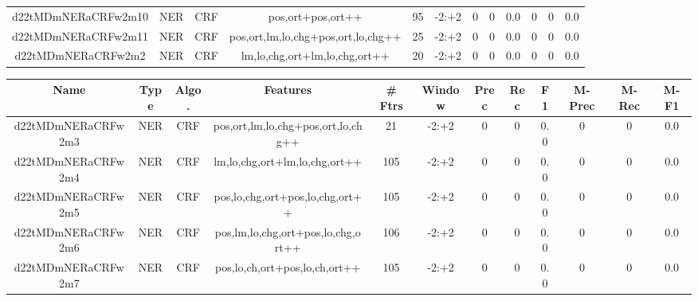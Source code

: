 \documentclass[a4paper]{article}
\begin{document}
\begin{landscape}
\begin{center}
\begin{tabular}{ |c|c|c|c|c|c|c|c|c|c|c|c|}
 
 	
 	\small{ d22tMDmNERaCRFw2m10 } & \small{ NER} & \small{  CRF }  & pos,ort+pos,ort++  &  95 &  \small{  -2:+2 }  &  0 & 0 & 0.0  &  0 & 0 & 0.0 \\
 	

 
 	
 	\small{ d22tMDmNERaCRFw2m11 } & \small{ NER} & \small{  CRF }  & pos,ort,lm,lo,chg+pos,ort,lo,chg++  &  25 &  \small{  -2:+2 }  &  0 & 0 & 0.0  &  0 & 0 & 0.0 \\
 	

 
 	
 	\small{ d22tMDmNERaCRFw2m2 } & \small{ NER} & \small{  CRF }  & lm,lo,chg,ort+lm,lo,chg,ort++  &  20 &  \small{  -2:+2 }  &  0 & 0 & 0.0  &  0 & 0 & 0.0 \\
 	
 \hline
\end{tabular}
\end{center}




\begin{center}
\begin{tabular}{ |c|c|c|c|c|c|c|c|c|c|c|c|} 
 \hline
 	Name & Type & Algo. & Features & \# Ftrs & Window & Prec & Rec & F1 & M-Prec & M-Rec & M-F1\\
 \hline

 	

 
 	
 	\small{ d22tMDmNERaCRFw2m3 } & \small{ NER} & \small{  CRF }  & pos,ort,lm,lo,chg+pos,ort,lo,chg++  &  21 &  \small{  -2:+2 }  &  0 & 0 & 0.0  &  0 & 0 & 0.0 \\
 	

 
 	
 	\small{ d22tMDmNERaCRFw2m4 } & \small{ NER} & \small{  CRF }  & lm,lo,chg,ort+lm,lo,chg,ort++  &  105 &  \small{  -2:+2 }  &  0 & 0 & 0.0  &  0 & 0 & 0.0 \\
 	

 
 	
 	\small{ d22tMDmNERaCRFw2m5 } & \small{ NER} & \small{  CRF }  & pos,lo,chg,ort+pos,lo,chg,ort++  &  105 &  \small{  -2:+2 }  &  0 & 0 & 0.0  &  0 & 0 & 0.0 \\
 	

 
 	
 	\small{ d22tMDmNERaCRFw2m6 } & \small{ NER} & \small{  CRF }  & pos,lm,lo,chg,ort+pos,lo,chg,ort++  &  106 &  \small{  -2:+2 }  &  0 & 0 & 0.0  &  0 & 0 & 0.0 \\
 	

 
 	
 	\small{ d22tMDmNERaCRFw2m7 } & \small{ NER} & \small{  CRF }  & pos,lo,ch,ort+pos,lo,ch,ort++  &  105 &  \small{  -2:+2 }  &  0 & 0 & 0.0  &  0 & 0 & 0.0 \\
 	


\end{tabular}
\end{center}
\end{landscape}
\end{document}
